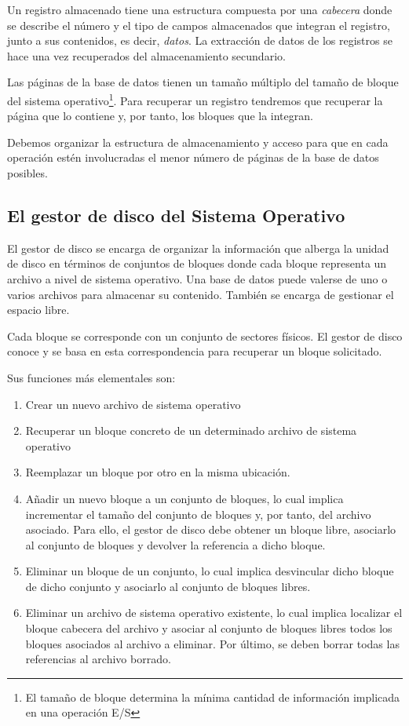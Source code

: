 \documentclass[10pt,a4paper,spanish]{report}
\begin{document}


Un registro almacenado tiene una estructura compuesta por una \textit{\textcolor[rgb]{1,0.2,0.3}{cabecera}} donde se describe el número y el tipo de campos almacenados que integran el registro, junto a sus contenidos, es decir, \textit{\textcolor[rgb]{1,0.2,0.3}{datos}}. La extracción de datos de los registros se hace una vez recuperados del almacenamiento secundario.

Las páginas de la base de datos tienen un tamaño múltiplo del tamaño de bloque del sistema operativo\footnote{El tamaño de bloque determina la mínima cantidad de información implicada en una operación E/S}. Para recuperar un registro tendremos que recuperar la página que lo contiene y, por tanto, los bloques que la integran.

Debemos organizar la estructura de almacenamiento y acceso para que en cada operación estén involucradas el menor número de páginas de la base de datos posibles.

\textcolor[rgb]{1,0.2,0.3}{\subsection{El gestor de disco del Sistema Operativo}}
El gestor de disco se encarga de organizar la información que alberga la unidad de disco en términos de conjuntos de bloques donde cada bloque representa un archivo a nivel de sistema operativo. Una base de datos puede valerse de uno o varios archivos para almacenar su contenido. También se encarga de gestionar el espacio libre.

Cada bloque se corresponde con un conjunto de sectores físicos. El gestor de disco conoce y se basa en esta correspondencia para recuperar un bloque solicitado.

Sus funciones más elementales son:
\begin{enumerate}[$\heartsuit$]
    \item Crear un nuevo archivo de sistema operativo
    \item Recuperar un bloque concreto de un determinado archivo de sistema operativo
    \item Reemplazar un bloque por otro en la misma ubicación.
    \item Añadir un nuevo bloque a un conjunto de bloques, lo cual implica incrementar el tamaño del conjunto de bloques y, por tanto, del archivo asociado. Para ello, el gestor de disco debe obtener un bloque libre, asociarlo al conjunto de bloques y devolver la referencia a dicho bloque.
    \item Eliminar un bloque de un conjunto, lo cual implica desvincular dicho bloque de dicho conjunto y asociarlo al conjunto de bloques libres.
    \item Eliminar un archivo de sistema operativo existente, lo cual implica localizar el bloque cabecera del archivo y asociar al conjunto de bloques libres todos los bloques asociados al archivo a eliminar. Por último, se deben borrar todas las referencias al archivo borrado.
\end{enumerate}
\end{document}
